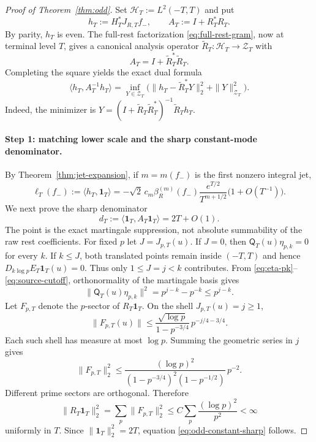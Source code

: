 
\begin{proof}[Proof of Theorem~\ref{thm:odd}]
Set $\mathscr H_T:=L^2(-T,T)$ and put
\[
 h_T:=H_T^*J_{R,T}f_-,
 \qquad
 A_T:=I+R_T^*R_T.
\]
By parity, $h_T$ is even.  The full-rest factorization
\eqref{eq:full-rest-gram}, now at terminal level $T$, gives a canonical analysis
operator $\widetilde R_T:\mathscr H_T\to\mathscr Z_T$ with
\[
 A_T=I+\widetilde R_T^*\widetilde R_T.
\]
Completing the square yields the exact dual formula
\[
 \boxed{
 \langle h_T,A_T^{-1}h_T\rangle
 =\inf_{Y\in\mathscr Z_T}
 \bigl(\|h_T-\widetilde R_T^*Y\|_2^2+\|Y\|_{\mathscr Z_T}^2\bigr).
 }
\tag{6.2}\label{eq:odd-dual}
\]
Indeed, the minimizer is
$Y=(I+\widetilde R_T\widetilde R_T^*)^{-1}\widetilde R_Th_T$.

\paragraph{Step 1: matching lower scale and the sharp constant-mode denominator.}
By Theorem~\ref{thm:jet-expansion}, if $m=m(f_-)$ is the first nonzero integral jet,
\[
 \ell_T(f_-):=\langle h_T,\mathbf1_T\rangle
 =-\sqrt2\,c_m\beta_R^{(m)}(f_-)
 \frac{e^{T/2}}{T^{m+1/2}}\bigl(1+O(T^{-1})\bigr).
\tag{6.3}\label{eq:odd-ell-leading}
\]
We next prove the sharp denominator
\[
 \boxed{
 d_T:=\langle\mathbf1_T,A_T\mathbf1_T\rangle=2T+O(1).
 }
\tag{6.4}\label{eq:odd-constant-sharp}
\]
The point is the exact martingale suppression, not absolute summability of the raw rest
coefficients.  For fixed $p$ let $J=J_{p,T}(u)$.  If $J=0$, then
$\mathsf Q_T(u)\eta_{p,k}=0$ for every $k$.  If $k\le J$, both translated points remain
inside $(-T,T)$ and hence
$D_{k\log p}E_T\mathbf1_T(u)=0$.  Thus only $1\le J=j<k$ contributes.  From
\eqref{eq:eta-pk}--\eqref{eq:source-cutoff}, orthonormality of the martingale basis gives
\[
 \|\mathsf Q_T(u)\eta_{p,k}\|^2
 =p^{j-k}-p^{-k}\le p^{j-k}.
\tag{6.4a}\label{eq:constant-mark-suppression}
\]
Let $F_{p,T}$ denote the $p$-sector of $R_T\mathbf1_T$.  On the shell
$J_{p,T}(u)=j\ge1$,
\[
 \|F_{p,T}(u)\|
 \le
 \frac{\sqrt{\log p}}{1-p^{-3/4}}\,p^{-j/4-3/4}.
\tag{6.4b}\label{eq:constant-p-shell-pointwise}
\]
Each such shell has measure at most $\log p$.  Summing the geometric series in $j$ gives
\[
 \|F_{p,T}\|_2^2
 \le
 \frac{(\log p)^2}{(1-p^{-3/4})^2(1-p^{-1/2})}\,p^{-2}.
\tag{6.4c}\label{eq:constant-p-shell-L2}
\]
Different prime sectors are orthogonal.  Therefore
\[
 \|R_T\mathbf1_T\|_2^2
 =\sum_p\|F_{p,T}\|_2^2
 \le C\sum_p\frac{(\log p)^2}{p^2}<\infty
\tag{6.4d}\label{eq:constant-rest-uniform}
\]
uniformly in $T$.  Since $\|\mathbf1_T\|_2^2=2T$, equation
\eqref{eq:odd-constant-sharp} follows.


\end{proof}
